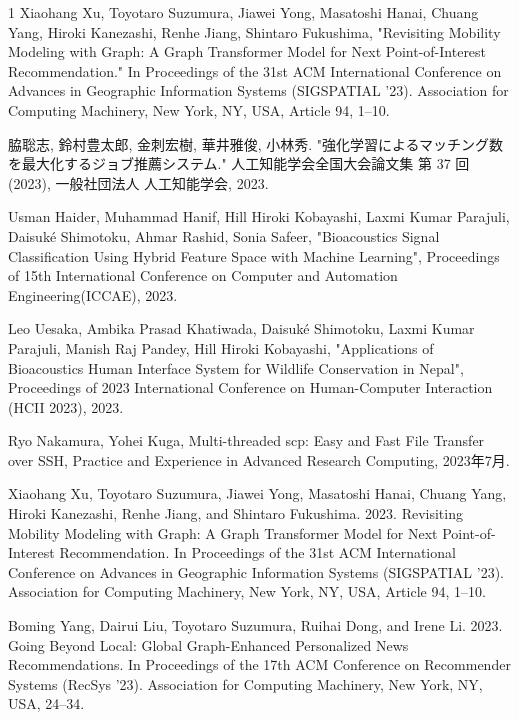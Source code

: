 \begin{査読付}{1}
Xiaohang Xu, Toyotaro Suzumura, Jiawei Yong, Masatoshi Hanai, Chuang Yang, Hiroki Kanezashi, Renhe Jiang, Shintaro Fukushima, 
"Revisiting Mobility Modeling with Graph: A Graph Transformer Model for Next Point-of-Interest Recommendation."
In Proceedings of the 31st ACM International Conference on Advances in Geographic Information Systems (SIGSPATIAL ’23). Association for Computing Machinery, New York, NY, USA, Article
94, 1–10.

脇聡志, 鈴村豊太郎, 金刺宏樹, 華井雅俊, 小林秀. "強化学習によるマッチング数を最大化するジョブ推薦システム." 人工知能学会全国大会論文集 第 37 回 (2023), 一般社団法人 人工知能学会, 2023.

 Usman Haider, Muhammad Hanif, Hill Hiroki Kobayashi, Laxmi Kumar Parajuli, Daisuké Shimotoku, Ahmar Rashid, Sonia Safeer, "Bioacoustics Signal Classification Using Hybrid Feature Space with Machine Learning", Proceedings of 15th International Conference on Computer and Automation Engineering(ICCAE), 2023.  

 Leo Uesaka, Ambika Prasad Khatiwada, Daisuk\'e Shimotoku, Laxmi Kumar Parajuli, Manish Raj Pandey, Hill Hiroki Kobayashi, "Applications of Bioacoustics Human Interface System for Wildlife Conservation in Nepal", Proceedings of 2023 International Conference on Human-Computer Interaction (HCII 2023), 2023.  

Ryo Nakamura, Yohei Kuga, Multi-threaded scp: Easy and Fast File Transfer over SSH, Practice and Experience in Advanced Research Computing, 2023年7月.



Xiaohang Xu, Toyotaro Suzumura, Jiawei Yong, Masatoshi Hanai, Chuang Yang, Hiroki Kanezashi, Renhe Jiang, and Shintaro Fukushima. 2023. Revisiting Mobility Modeling with Graph: A Graph Transformer Model for Next Point-of-Interest Recommendation. In Proceedings of the 31st ACM International Conference on Advances in Geographic Information Systems (SIGSPATIAL '23). Association for Computing Machinery, New York, NY, USA, Article 94, 1–10.

Boming Yang, Dairui Liu, Toyotaro Suzumura, Ruihai Dong, and Irene Li. 2023. Going Beyond Local: Global Graph-Enhanced Personalized News Recommendations. In Proceedings of the 17th ACM Conference on Recommender Systems (RecSys '23). Association for Computing Machinery, New York, NY, USA, 24–34.


\end{査読付}
